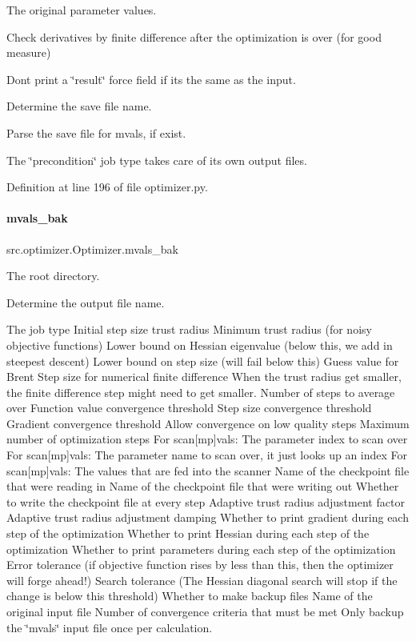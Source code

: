 The original parameter values. 

Check derivatives by finite difference after the optimization is over (for good measure)

Don\textquotesingle{}t print a \char`\"{}result\char`\"{} force field if it\textquotesingle{}s the same as the input.

Determine the save file name.

Parse the save file for mvals, if exist.

The \char`\"{}precondition\char`\"{} job type takes care of its own output files. 

Definition at line 196 of file optimizer.\+py.

\mbox{\label{classsrc_1_1optimizer_1_1Optimizer_aca8aba40ee48e50e42eaabfe5bf883cf}} 
\paragraph{\texorpdfstring{mvals\+\_\+bak}{mvals\_bak}}
{\footnotesize\ttfamily src.\+optimizer.\+Optimizer.\+mvals\+\_\+bak}



The root directory. 

Determine the output file name.

The job type Initial step size trust radius Minimum trust radius (for noisy objective functions) Lower bound on Hessian eigenvalue (below this, we add in steepest descent) Lower bound on step size (will fail below this) Guess value for Brent Step size for numerical finite difference When the trust radius get smaller, the finite difference step might need to get smaller. Number of steps to average over Function value convergence threshold Step size convergence threshold Gradient convergence threshold Allow convergence on low quality steps Maximum number of optimization steps For scan\mbox{[}mp\mbox{]}vals\+: The parameter index to scan over For scan\mbox{[}mp\mbox{]}vals\+: The parameter name to scan over, it just looks up an index For scan\mbox{[}mp\mbox{]}vals\+: The values that are fed into the scanner Name of the checkpoint file that we\textquotesingle{}re reading in Name of the checkpoint file that we\textquotesingle{}re writing out Whether to write the checkpoint file at every step Adaptive trust radius adjustment factor Adaptive trust radius adjustment damping Whether to print gradient during each step of the optimization Whether to print Hessian during each step of the optimization Whether to print parameters during each step of the optimization Error tolerance (if objective function rises by less than this, then the optimizer will forge ahead!) Search tolerance (The Hessian diagonal search will stop if the change is below this threshold) Whether to make backup files Name of the original input file Number of convergence criteria that must be met Only backup the \char`\"{}mvals\char`\"{} input file once per calculation.

